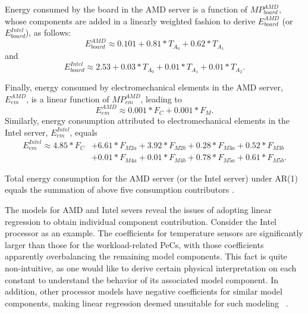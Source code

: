 \documentclass[acmtaco]{acmtrans2m}
\begin{document}
Energy consumed by the board in the AMD server is a function of $MP_{board}^{AMD}$,
whose components are added in a linearly weighted fashion to derive
$E_{board}^{AMD}$ (or $E_{board}^{Intel}$), as follows:
\begin{equation*}
E_{board}^{AMD} \approx 0.101+0.81*T_{A_{0}}+0.62*T_{A_{1}}
\end{equation*}
and
\begin{equation*}
E_{board}^{Intel} \approx 2.53+0.03*T_{A_{0}}+0.01*T_{A_{1}}+0.01*T_{A_{2}}.
\end{equation*}

Finally, energy consumed by electromechanical elements in the AMD server, $E_{em}^{AMD}$,
is a linear function of $MP_{em}^{AMD}$, leading to
\begin{equation*}
E_{em}^{AMD} \approx 0.001*F_{C}+0.001*F_{M}.
\end{equation*}
Similarly, energy consumption attributed to electromechanical elements in the Intel server, $E_{em}^{Intel}$, equals
\begin{align*}
E_{em}^{Intel}\approx4.85*F_{C}&+6.61*F_{M2a}+3.92*F_{M2b}+0.28*F_{M3a}+0.52*F_{M3b}\\
            &+0.01*F_{M4a}+0.01*F_{M4b}+0.78*F_{M5a}+0.61*F_{M5b}.
\end{align*}

Total energy consumption for the AMD server (or the Intel server)
under AR(1) equals the summation of above five consumption contributors
\cite{Lewis2008}.

The models for AMD and Intel severs reveal the issues of adopting linear
regression to obtain individual component contribution.  Consider the
Intel processor as an example.  The coefficients for temperature sensors
are significantly larger than those for the workload-related PeCs, with
those coefficients apparently overbalancing the remaining model
components.  This fact is quite non-intuitive, as one would like to
derive certain physical interpretation on each constant to understand
the behavior of its associated model component.  In addition, other
processor models have negative coefficients for similar model
components, making linear regression deemed unsuitable for such modeling
~\cite{Bertran2010,McCullough2011}.

\end{document}

